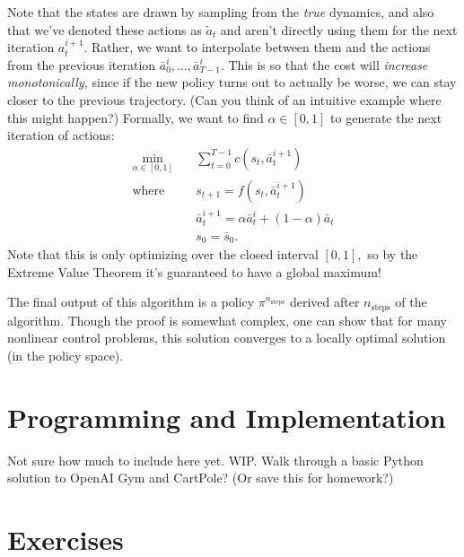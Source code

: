\documentclass[../main/main]{subfiles}
\begin{document}
Note that the states are drawn by sampling from the \emph{true} dynamics,
and also that we've denoted these actions as $\tilde a_t$ and aren't directly using them for the next iteration $a^{i+1}_t$.
Rather, we want to interpolate between them and the actions from the previous iteration $\bar a^i_0, \dots, \bar a^i_{T-1}.$
This is so that the cost will \emph{increase monotonically,} since if the new policy turns out to actually be worse, we can stay closer to the previous trajectory. (Can you think of an intuitive example where this might happen?)
Formally, we want to find $\alpha \in [0, 1]$ to generate the next iteration of actions: \begin{align*}
    \min_{\alpha \in [0, 1]} \quad & \sum_{t=0}^{T-1} c(s_t, \bar a^{i+1}_t) \\
    \text{where} \quad & s_{t+1} = f(s_t, \bar a^{i+1}_t) \\
    & \bar a^{i+1}_t = \alpha \bar a^i_t + (1-\alpha) \bar a_t \\
    & s_0 = \bar s_0.
\end{align*}
Note that this is only optimizing over the closed interval $[0, 1],$ so by the Extreme Value Theorem it's guaranteed to have a global maximum!

The final output of this algorithm is a policy $\pi^{n_\text{steps}}$ derived after $n_\text{steps}$ of the algorithm.
Though the proof is somewhat complex, one can show that for many nonlinear control problems, this solution converges to a locally optimal solution (in the policy space).


\section{Programming and Implementation}

Not sure how much to include here yet. WIP. Walk through a basic Python solution
to OpenAI Gym and CartPole? (Or save this for homework?)



\section{Exercises}
\end{document}
